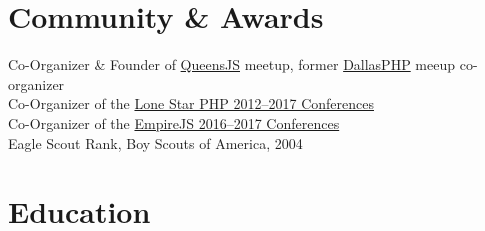 \documentclass{resume}
\begin{document}
\section{Community \& Awards}

Co-Organizer \& Founder of \href{http://queensjs.com/}{QueensJS} meetup, former \href{http://www.meetup.com/dallasphp/}{DallasPHP} meeup co-organizer
\\
Co-Organizer of the \href{http://lonestarphp.com/}{Lone Star PHP 2012--2017 Conferences}
\\
Co-Organizer of the \href{http://empirejs.org/}{EmpireJS 2016--2017 Conferences}
\\
Eagle Scout Rank, Boy Scouts of America, 2004

\section{Education}

\end{document}
